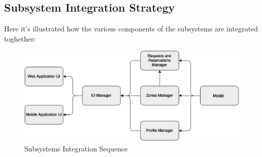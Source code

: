 \documentclass[../../../../../../testPlan.tex]{subfiles}
\begin{document}
	\subsection{Subsystem Integration Strategy}
		Here it's illustrated how the various components of the subsystems are integrated toghether:
		\begin{figure}[H]
			\centering
			\includegraphics[width=\textwidth, scale=0.5]{../images/priority_subsystems.png}
			\caption{Subsystems Integration Sequence}\label{fig:SubsystemsSequence}
		\end{figure}
	
	 
\end{document}
